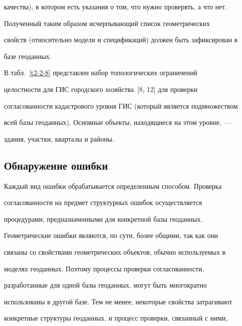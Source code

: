качества), в котором есть указания о том, что нужно проверять, а что нет. 


    


    Полученный таким образом исчерпывающий список геометрических 


свойств (относительно модели и спецификаций) должен быть зафиксирован в 


базе геоданных. 


    


    В табл.~\ref{t2-2-8} представлен набор топологических ограничений 


целостности для ГИС городского хозяйства~[8, 12] для проверки 


согласованности кадастрового уровня ГИС (который является подмножеством 


всей базы геоданных). Основные объекты, находящиеся на этом уровне,~--- 


здания, участки, кварталы и районы. 


     





    


\subsection{Обнаружение ошибки}


    


    Каждый вид ошибки обрабатывается определенным способом. Проверка 


согласованности на предмет структурных ошибок осуществляется 


процедурами, предназначенными для конкретной базы геоданных. 


    


    Геометрические ошибки являются, по сути, более общими, так как они 


связаны со свойствами геометрических объектов, обычно используемых в 


моделях геоданных. Поэтому процессы проверки согласованности, 


разработанные для одной базы геоданных, могут быть многократно 


использованы в другой базе. Тем не менее, некоторые свойства затрагивают 


конкретные структуры геоданных, и процесс проверки, связанный с ними, 



